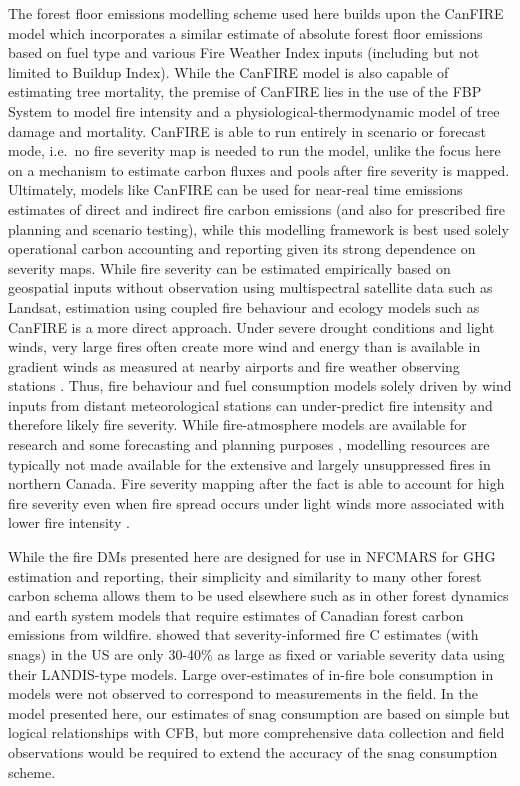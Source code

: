 \documentclass[, manuscript]{copernicus}
\begin{document}
The forest floor emissions modelling scheme used here builds upon the
CanFIRE model \citep{degroot2013} which incorporates a similar estimate
of absolute forest floor emissions based on fuel type and various Fire
Weather Index inputs (including but not limited to Buildup Index). While
the CanFIRE model is also capable of estimating tree mortality, the
premise of CanFIRE lies in the use of the FBP System to model fire
intensity and a physiological-thermodynamic model of tree damage and
mortality. CanFIRE is able to run entirely in scenario or forecast mode,
i.e.~no fire severity map is needed to run the model, unlike the focus
here on a mechanism to estimate carbon fluxes and pools after fire
severity is mapped. Ultimately, models like CanFIRE can be used for
near-real time emissions estimates of direct and indirect fire carbon
emissions (and also for prescribed fire planning and scenario testing),
while this modelling framework is best used solely operational carbon
accounting and reporting given its strong dependence on severity maps.
While fire severity can be estimated empirically based on geospatial
inputs without observation using multispectral satellite data such as
Landsat, estimation using coupled fire behaviour and ecology models such
as CanFIRE is a more direct approach. Under severe drought conditions
and light winds, very large fires often create more wind and energy than
is available in gradient winds as measured at nearby airports and fire
weather observing stations
\citep{clarkAnalysisSmallScaleConvective1999}. Thus, fire behaviour and
fuel consumption models solely driven by wind inputs from distant
meteorological stations can under-predict fire intensity and therefore
likely fire severity. While fire-atmosphere models are available for
research \citep{coenGenerationForecastExtreme2018} and some forecasting
and planning purposes \citep{linn2020}, modelling resources are
typically not made available for the extensive and largely unsuppressed
fires in northern Canada. Fire severity mapping after the fact is able
to account for high fire severity \citep{whitman2018} even when fire
spread occurs under light winds more associated with lower fire
intensity \citep{whitman2024}.

While the fire DMs presented here are designed for use in NFCMARS for
GHG estimation and reporting, their simplicity and similarity to many
other forest carbon schema allows them to be used elsewhere such as in
other forest dynamics \citep{brecka2020} and earth system models
\citep{melton2020} that require estimates of Canadian forest carbon
emissions from wildfire. \citet{stenzel2019} showed that
severity-informed fire C estimates (with snags) in the US are only
30-40\% as large as fixed or variable severity data using their
LANDIS-type models. Large over-estimates of in-fire bole consumption in
models were not observed to correspond to measurements in the field. In
the model presented here, our estimates of snag consumption are based on
simple but logical relationships with CFB, but more comprehensive data
collection and field observations would be required to extend the
accuracy of the snag consumption scheme.
\end{document}
